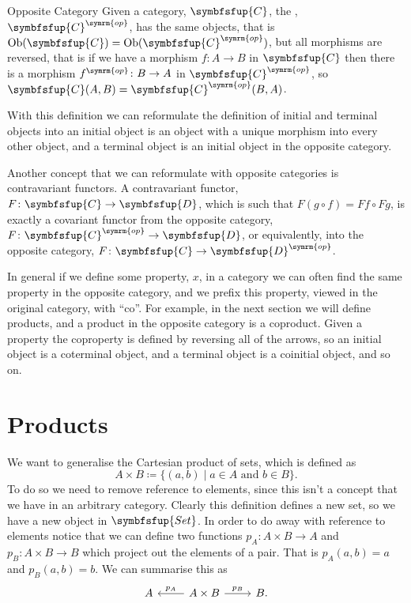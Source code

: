 \documentclass[fleqn]{NotesClass}
\makeatletter
\newcommand{\cat}[1]{\symbfsfup{#1}}
\newcommand{\c@egory}[1]{\symbfsfup{#1}}
\newcommand{\Set}{\c@egory{Set}}
\DeclareMathOperator{\Ob}{Ob}
\newcommand{\op}{\symrm{op}}
\makeatother
\begin{document}
    \begin{dfn}{Opposite Category}{}
        Given a category, \(\cat{C}\), the , \(\cat{C}^{\op}\), has the same objects, that is \(\Ob(\cat{C}) = \Ob(\cat{C}^{\op})\), but all morphisms are reversed, that is if we have a morphism \(f\colon A \to B\) in \(\cat{C}\) then there is a morphism \(f^{\op}\colon B \to A\) in \(\cat{C}^{\op}\), so \(\cat{C}(A, B) = \cat{C}^{\op}(B, A)\).
    \end{dfn}
    
    With this definition we can reformulate the definition of initial and terminal objects into an initial object is an object with a unique morphism into every other object, and a terminal object is an initial object in the opposite category.
    
    Another concept that we can reformulate with opposite categories is contravariant functors.
    A contravariant functor, \(F \colon \cat{C} \to \cat{D}\), which is such that \(F(g \circ f) = Ff \circ Fg\), is exactly a covariant functor from the opposite category, \(F\colon \cat{C}^{\op} \to \cat{D}\), or equivalently, into the opposite category, \(F\colon \cat{C} \to \cat{D}^{\op}\).
    
    In general if we define some property, \(x\), in a category we can often find the same property in the opposite category, and we prefix this property, viewed in the original category, with \enquote{co}.
    For example, in the next section we will define products, and a product in the opposite category is a coproduct.
    Given a property the coproperty is defined by reversing all of the arrows, so an initial object is a coterminal object, and a terminal object is a coinitial object, and so on.
    
    \section{Products}
    We want to generalise the Cartesian product of sets, which is defined as
    \begin{equation}
        A \times B \coloneqq \{(a, b) \mid a \in A \text{ and } b \in B\}.
    \end{equation}
    To do so we need to remove reference to elements, since this isn't a concept that we have in an arbitrary category.
    Clearly this definition defines a new set, so we have a new object in \(\Set\).
    In order to do away with reference to elements notice that we can define two functions \(p_A \colon A \times B \to A\) and \(p_B \colon A \times B \to B\) which project out the elements of a pair.
    That is \(p_A(a, b) = a\) and \(p_B(a, b) = b\).
    We can summarise this as
    \begin{equation}
        \begin{tikzcd}
            A & A \times B \arrow[l, "p_A"'] \arrow[r, "p_B"] & B.
        \end{tikzcd}
    \end{equation}
    
\end{document}
